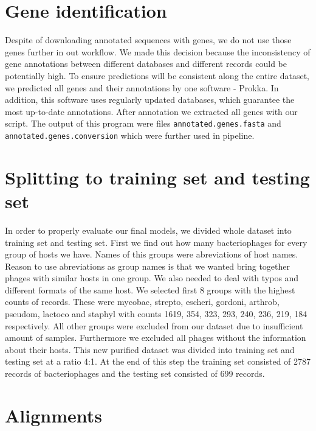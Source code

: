 \section{Gene identification}
Despite of downloading annotated sequences with genes, we do not use those genes further in out workflow.
We made this decision because the inconsistency of gene annotations between different databases and different records could be potentially high.
To ensure predictions will be consistent along the entire dataset, we predicted all genes and their annotations by one software - Prokka.
In addition, this software uses regularly updated databases, which guarantee the most up-to-date annotations.
After annotation we extracted all genes with our script.
The output of this program were files \verb|annotated.genes.fasta| and \verb|annotated.genes.conversion| which were further used in pipeline.

\section{Splitting to training set and testing set}
In order to properly evaluate our final models, we divided whole dataset into training set and testing set.
First we find out how many bacteriophages for every group of hosts we have. 
Names of this groups were abreviations of host names.
Reason to use abreviations as group names is that we wanted bring together phages with similar hosts in one group.
We also needed to deal with typos and different formats of the same host.
We selected first 8 groups with the highest counts of records.
These were mycobac, strepto, escheri, gordoni, arthrob, pseudom, lactoco and staphyl with counts 1619, 354, 323, 293, 240, 236, 219, 184 respectively.
All other groups were excluded from our dataset due to insufficient amount of samples.
Furthermore we excluded all phages without the information about their hosts.
This new purified dataset was divided into training set and testing set at a ratio 4:1.
At the end of this step the training set consisted of 2787 records of bacteriophages and the testing set consisted of 699 records.

\section{Alignments}
